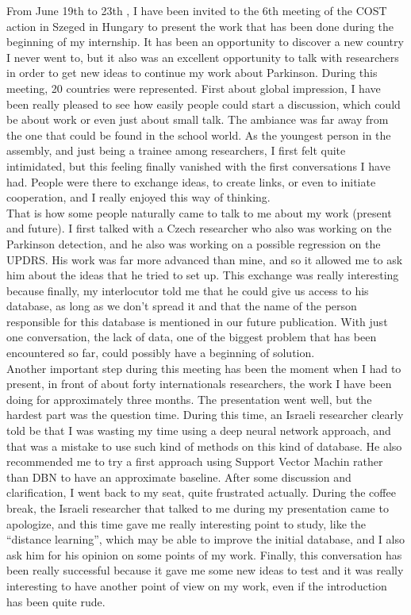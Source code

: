 \documentclass{report}
\begin{document}
	From June 19th to 23th   , I have been invited to the 6th meeting of the COST action in Szeged in Hungary to present the work that has been done during the beginning of my internship. It has been an opportunity to discover a new country I never went to, but it also was an excellent opportunity to talk with researchers in order to get new ideas to continue my work about Parkinson. During this meeting, 20 countries were represented.
	First about global impression, I have been really pleased to see how easily people could start a discussion, which could be about work or even just about small talk. The ambiance was far away from the one that could be found in the school world. As the youngest person in the assembly, and just being a trainee among researchers, I first felt quite intimidated, but this feeling finally vanished with the first conversations I have had. People were there to exchange ideas, to create links, or even to initiate cooperation, and I really enjoyed this way of thinking.\\
	
	That is how some people naturally came to talk to me about my work (present and future). I first talked with a Czech researcher who also was working on the Parkinson detection, and he also was working on a possible regression on the UPDRS. His work was far more advanced than mine, and so it allowed me to ask him about the ideas that he tried to set up. This exchange was really interesting because finally, my interlocutor told me that he could give us access to his database, as long as we don't spread it and that the name of the person responsible for this database is mentioned in our future publication. With just one conversation, the lack of data, one of the biggest problem that has been encountered so far, could possibly have a beginning of solution.\\
	
	Another important step during this meeting has been the moment when I had to present, in front of about forty internationals researchers, the work I have been doing for approximately three months. The presentation went well, but the hardest part was the question time. During this time, an Israeli researcher clearly told be that I was wasting my time using a deep neural network approach, and that was a mistake to use such kind of methods on this kind of database. He also recommended me to try a first approach using Support Vector Machin rather than DBN to have an approximate baseline. After some discussion and clarification, I went back to my seat, quite frustrated actually. During the coffee break, the Israeli researcher that talked to me during my presentation came to apologize, and this time gave me really interesting point to study, like the “distance learning”, which may be able to improve the initial database, and I also ask him for his opinion on some points  of my work. Finally, this conversation has been really successful because it gave me some new ideas to test and it was really interesting to have another point of view on my work, even if the introduction has been quite rude.\\
	
\end{document}
